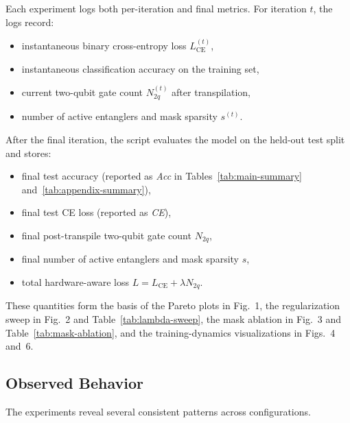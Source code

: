 \documentclass[conference]{IEEEtran}
\begin{document}
Each experiment logs both per-iteration and final metrics. For iteration $t$, the logs record:
\begin{itemize}
    \item instantaneous binary cross-entropy loss $L_{\text{CE}}^{(t)}$,
    \item instantaneous classification accuracy on the training set,
    \item current two-qubit gate count $N_{2q}^{(t)}$ after transpilation,
    \item number of active entanglers and mask sparsity $s^{(t)}$.
\end{itemize}
After the final iteration, the script evaluates the model on the held-out test split and stores:
\begin{itemize}
    \item final test accuracy (reported as \textit{Acc} in Tables~\ref{tab:main-summary} and~\ref{tab:appendix-summary}),
    \item final test CE loss (reported as \textit{CE}),
    \item final post-transpile two-qubit gate count $N_{2q}$,
    \item final number of active entanglers and mask sparsity $s$,
    \item total hardware-aware loss $L = L_{\text{CE}} + \lambda N_{2q}$.
\end{itemize}
These quantities form the basis of the Pareto plots in Fig.~1, the regularization sweep in Fig.~2 and Table~\ref{tab:lambda-sweep}, the mask ablation in Fig.~3 and Table~\ref{tab:mask-ablation}, and the training-dynamics visualizations in Figs.~4 and~6.

\subsection{Observed Behavior}

The experiments reveal several consistent patterns across configurations.
\end{document}
